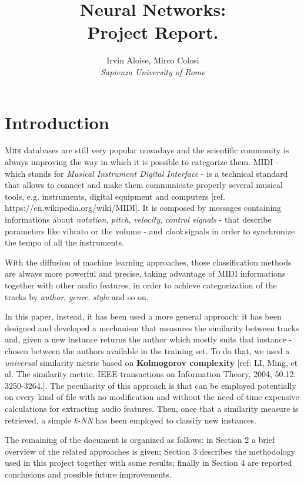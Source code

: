 \documentclass[a4paper]{article}
\title{ \huge Neural Networks: \\
	Project Report.}
\author{Irvin Aloise, Mirco Colosi\\
	\textit{Sapienza University of Rome}}
\begin{document}
	
	\maketitle
	
	\section{Introduction}
	\lettrine[nindent=0em,lines=2]{M}{idi} databases are still very popular nowadays and the scientific community is always improving the way in which it is possible to categorize them. MIDI - which stands for \textit{Musical Instrument Digital Interface} - is a technical standard that allows to connect and make them communicate properly several musical tools, e.g. instruments, digital equipment and computers [ref. https://en.wikipedia.org/wiki/MIDI]. It is composed by messages containing informations about \textit{notation}, \textit{pitch}, \textit{velocity}, \textit{control signals} - that describe parameters like vibrato or the volume - and \textit{clock} signals in order to synchronize the tempo of all the instruments.
	
	With the diffusion of machine learning approaches, those classification methods are always more powerful and precise, taking advantage of MIDI informations together with other audio features, in order to achieve categorization of the tracks by \textit{author}, \textit{genre}, \textit{style} and so on. 
	
	In this paper, instead, it has been used a more general approach: it has been designed and developed a mechanism that measures the similarity between tracks and, given a new instance returns the author which mostly suits that instance - chosen between the authors available in the training set. To do that, we used a \textit{universal} similarity metric based on \textbf{Kolmogorov complexity} [ref: LI, Ming, et al. The similarity metric. IEEE transactions on Information Theory, 2004, 50.12: 3250-3264.]. The peculiarity of this approach is that can be employed potentially on every kind of file with no modification and without the need of time expensive calculations for extracting audio features. Then, once that a similarity measure is retrieved, a simple \textit{k-NN} has been employed to classify new instances.
	
	The remaining of the document is organized as follows: in Section 2 a brief overview of the related approaches is given; Section 3 describes the methodology used in this project together with some results; finally in Section 4 are reported conclusions and possible future improvements.
	
\end{document}
